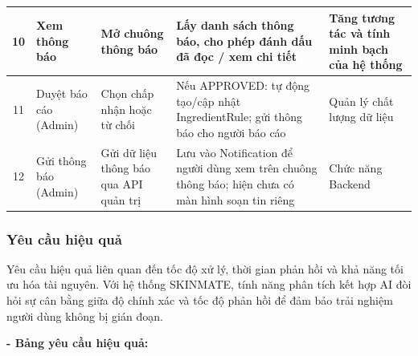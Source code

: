 \documentclass[12pt,a4paper]{article}
\begin{document}
\begin{center}
\renewcommand{\arraystretch}{1.3}
\begin{tabular}{|c|p{3.5cm}|p{4cm}|p{4.5cm}|p{2cm}|}
\hline
10 & Xem thông báo & Mở chuông thông báo & Lấy danh sách thông báo, cho phép đánh dấu đã đọc / xem chi tiết & Tăng tương tác và tính minh bạch của hệ thống \\
\hline
11 & Duyệt báo cáo (Admin) & Chọn chấp nhận hoặc từ chối & Nếu APPROVED: tự động tạo/cập nhật IngredientRule; gửi thông báo cho người báo cáo & Quản lý chất lượng dữ liệu \\
\hline
12 & Gửi thông báo (Admin) & Gửi dữ liệu thông báo qua API quản trị & Lưu vào Notification để người dùng xem trên chuông thông báo; hiện chưa có màn hình soạn tin riêng & Chức năng Backend \\
\hline
\end{tabular}
\end{center}





\subsubsection{Yêu cầu hiệu quả}
Yêu cầu hiệu quả liên quan đến tốc độ xử lý, thời gian phản hồi và khả năng tối ưu hóa tài nguyên. Với hệ thống SKINMATE, tính năng phân tích kết hợp AI đòi hỏi sự cân bằng giữa độ chính xác và tốc độ phản hồi để đảm bảo trải nghiệm người dùng không bị gián đoạn.

\textbf{- Bảng yêu cầu hiệu quả:}
\end{document}
